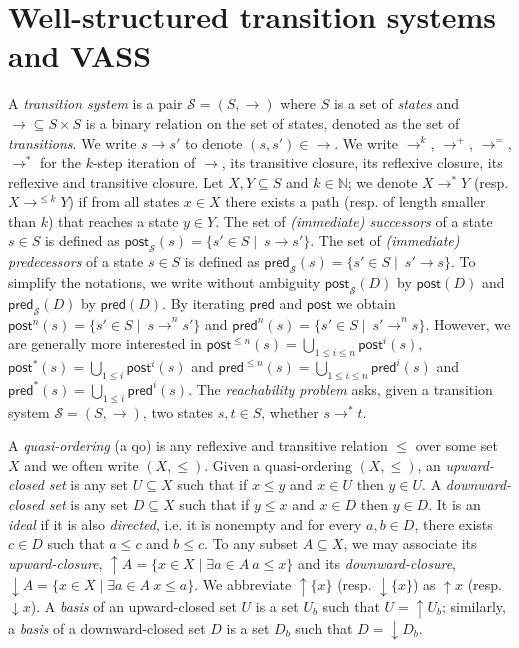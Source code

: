 \documentclass[runningheads]{llncs}
\newcommand{\pred}{\textsf{pred}}
\newcommand{\post}{\textsf{post}}
\begin{document}
\section{Well-structured transition systems and VASS}\label{section definitions}




\noindent
 A {\em transition system} is a pair $\mathscr{S} = (S,\rightarrow )$ where $S$ is a set of 
 {\em states} and  
 $ {\rightarrow} \subseteq S \times S$ is a
 binary relation 
 on
 the set of states, denoted as the set of {\em transitions}. 
%
We write $s \rightarrow s'$ to denote $ (s,s') \in  {\rightarrow} $.
We write $\rightarrow^{k}$, $\rightarrow^{+}$, $\rightarrow^{=}$, $\rightarrow^{*}$
for the $k$-step iteration of $\rightarrow$, its transitive closure, its reflexive closure, its reflexive and transitive closure.
Let $X,Y \subseteq S$ and $k \in \mathbb{N}$; we denote $X \longrightarrow^{*} Y$ (resp. $X \longrightarrow^{\leq k} Y$) if from all states $x \in X$ there exists a path (resp. of length smaller than $k$) that reaches a state $y \in Y$.
\noindent
The set of {\em (immediate) successors} of a state $s \in S$ is defined as 
 $\post_{\mathscr{S}}(s) = \{ s' \in S \mid  ~ s \xrightarrow{} s'\}$. 
The set of {\em (immediate) predecessors} of a state $s \in S$ is deﬁned as
 $\pred_{\mathscr{S}}(s) = \{ s' \in S \mid  ~ s' \xrightarrow{} s\}$. 
To simplify the notations, we write without ambiguity $\post_{\mathscr{S}}(D)$ by $\post(D)$ and  $\pred_{\mathscr{S}}(D)$ by  $\pred(D)$.
By iterating $\pred$ and $\post$ we obtain  
$\post^n(s) = \{ s' \in S \mid  ~ s \xrightarrow{}^n s'\}$
and
$\pred^n(s) = \{ s' \in S \mid  ~ s' \xrightarrow{}^n s\}$.
However, we are generally more interested in
$\post^{\leq n}(s) = \bigcup_{1 \leq i \leq n} \post^i(s)$, $\post^*(s)= \bigcup_{1 \leq i} \post^i(s)$
and
$\pred^{\leq n}(s) = \bigcup_{1 \leq i \leq n} \pred^i(s)$ and $\pred^*(s) = \bigcup_{1 \leq i} \pred^i(s)$. 
The {\em reachability problem} asks, given a transition system $\mathscr{S} = (S, \to)$, two states $s, t \in S$, whether $s \to^* t$. 

%


A {\em quasi-ordering} (a qo) is any reflexive and transitive relation $\leq$ over some set $X$ and we often write $(X,\leq)$. 
Given a quasi-ordering $(X,\leq)$, an {\em upward-closed set} is any set $U \subseteq X$ such that if $x \leq y$ and $x \in U$ then $y \in U $.
A {\em downward-closed set} is any set $D \subseteq X$ such that if $y \leq x$ and $x \in D$ then $y \in D $. 
It is an {\em ideal } if it is also {\em directed}, i.e. it is nonempty and for every $a,b \in D$, there exists $c \in D$ such that $a \leq c$ and $b \leq c$.
To any subset $A \subseteq X$, we may associate
its {\em upward-closure},
 $\mathop{\uparrow} A = \{x \in X \mid \exists a \in A ~ a \leq x\}$
 and its 
 {\em downward-closure},
 $\mathop{\downarrow} A = \{x \in X \mid \exists a \in A ~ x \leq a\}$. 
We abbreviate $\mathop{\uparrow} \{x\}$ (resp. $\mathop{\downarrow} \{x\}$)
as $\mathop{\uparrow} x$ (resp. $\mathop{\downarrow} x$).
%
A {\em basis} of an upward-closed set $U$ is a set $U_b$ such that $U = \mathop{\uparrow} U_b$; similarly, a {\em basis} of a downward-closed set $D$ is a set $D_b$ such that $D = \mathop{\downarrow} D_b$.
\end{document}
